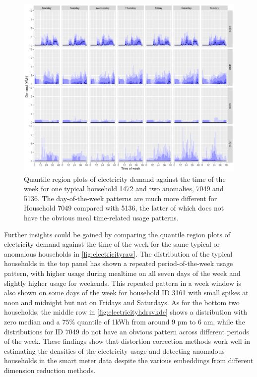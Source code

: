 \documentclass[11pt,a4paper,]{article}
\begin{document}
\begin{figure}

{\centering \includegraphics[width=0.9\linewidth]{figures/Electricity_2d_plot_hdrbox_7dow_4id_1typical_3anomalous} 

}

\caption{Quantile region plots of electricity demand against the time of the week for one typical household 1472 and two anomalies, 7049 and 5136. The day-of-the-week patterns are much more different for Household 7049 compared with 5136, the latter of which does not have the obvious meal time-related usage patterns.}\label{fig:electricityhdrsvkde}
\end{figure}

Further insights could be gained by comparing the quantile region plots of electricity demand against the time of the week for the same typical or anomalous households in \autoref{fig:electricityraw}. The distribution of the typical households in the top panel has shown a repeated period-of-the-week usage pattern, with higher usage during mealtime on all seven days of the week and slightly higher usage for weekends.
This repeated pattern in a week window is also shown on some days of the week for household ID 3161 with small spikes at noon and midnight but not on Fridays and Saturdays. As for the bottom two households, the middle row in \autoref{fig:electricityhdrsvkde} shows a distribution with zero median and a \(75\%\) quantile of 1kWh from around 9 pm to 6 am, while the distributions for ID 7049 do not have an obvious pattern across different periods of the week. These findings show that distortion correction methods work well in estimating the densities of the electricity usage and detecting anomalous households in the smart meter data despite the various embeddings from different dimension reduction methods.
\end{document}
